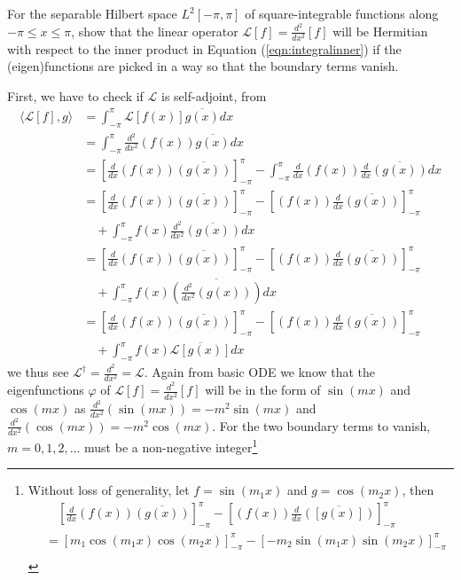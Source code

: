 \begin{exmp}
\label{exmp:Fourierbasis}
For the separable Hilbert space $L^2[-\pi, \pi]$ of square-integrable functions along $-\pi \leq x \leq \pi$, show that the linear operator $\mathcal{L}[f] = \frac{d^2}{dx^2}[f]$ will be Hermitian with respect to the inner product in Equation (\ref{eqn:integralinner}) if the (eigen)functions are picked in a way so that the boundary terms vanish.
\end{exmp}
\begin{solution}
First, we have to check if $\mathcal{L}$ is self-adjoint, from
\begin{align*}
\langle \mathcal{L}[f], g \rangle &= \int_{-\pi}^\pi \mathcal{L}[f(x)] \overline{g(x)} dx \\
&= \int_{-\pi}^\pi \frac{d^2}{dx^2}(f(x)) \overline{g(x)} dx \\
&= [\frac{d}{dx}(f(x)) \overline{(g(x))}]_{-\pi}^\pi - \int_{-\pi}^\pi \frac{d}{dx}(f(x)) \frac{d}{dx}\overline{(g(x))} dx \\
&= [\frac{d}{dx}(f(x)) \overline{(g(x))}]_{-\pi}^\pi - [(f(x)) \frac{d}{dx}\overline{(g(x))}]_{-\pi}^\pi \\
&\quad + \int_{-\pi}^\pi f(x) \frac{d^2}{dx^2}\overline{(g(x))} dx \\
&= [\frac{d}{dx}(f(x)) \overline{(g(x))}]_{-\pi}^\pi - [(f(x)) \frac{d}{dx}\overline{(g(x))}]_{-\pi}^\pi \\
&\quad + \int_{-\pi}^\pi f(x) \overline{\left(\frac{d^2}{dx^2}(g(x))\right)} dx \\
&= [\frac{d}{dx}(f(x)) \overline{(g(x))}]_{-\pi}^\pi - [(f(x)) \frac{d}{dx}\overline{(g(x))}]_{-\pi}^\pi \\
&\quad + \int_{-\pi}^\pi f(x) \overline{\mathcal{L}[g(x)]} dx
\end{align*}
we thus see $\mathcal{L}^\dag = \frac{d^2}{dx^2} = \mathcal{L}$. Again from basic ODE we know that the eigenfunctions $\varphi$ of $\mathcal{L}[f] = \frac{d^2}{dx^2}[f]$ will be in the form of $\sin(mx)$ and $\cos(mx)$ as $\frac{d^2}{dx^2}(\sin(mx)) = -m^2\sin(mx)$ and $\frac{d^2}{dx^2}(\cos(mx)) = -m^2\cos(mx)$. For the two boundary terms to vanish, $m = 0, 1, 2, \ldots$ must be a non-negative integer\footnote{Without loss of generality, let $f = \sin(m_1 x)$ and $g = \cos(m_2 x)$, then
\begin{align*}
&\quad [\frac{d}{dx}(f(x)) \overline{(g(x))}]_{-\pi}^\pi - [(f(x)) \frac{d}{dx}\overline{([g(x)])}]_{-\pi}^\pi \\
&= [m_1\cos(m_1 x)\cos(m_2 x)]_{-\pi}^\pi - [-m_2\sin(m_1 x)\sin(m_2 x)]_{-\pi}^\pi \\

\end{align*}}
\end{solution}
